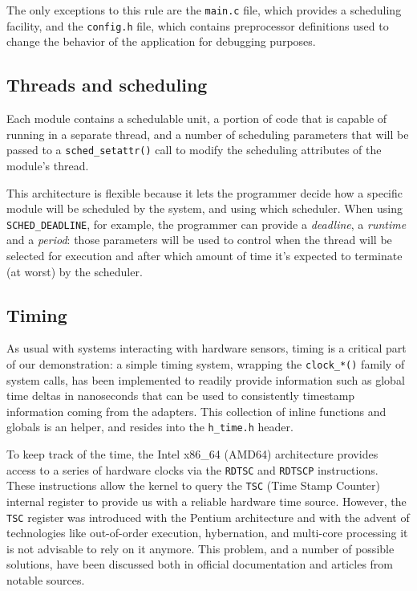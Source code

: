 \documentclass[a4paper,12pt]{report}
\begin{document}
The only exceptions to this rule are the \texttt{main.c} file, which provides a scheduling facility, and the \texttt{config.h} file, which contains preprocessor definitions used to change the behavior of the application for debugging purposes.

\subsection{Threads and scheduling}

Each module contains a schedulable unit, a portion of code that is capable of running in a separate thread, and a number of scheduling parameters that will be passed to a \texttt{sched\_setattr()} call to modify the scheduling attributes of the module's thread.

This architecture is flexible because it lets the programmer decide how a specific module will be scheduled by the system, and using which scheduler. When using \texttt{SCHED\_DEADLINE}, for example, the programmer can provide a \textit{deadline}, a \textit{runtime} and a \textit{period}: those parameters will be used to control when the thread will be selected for execution and after which amount of time it's expected to terminate (at worst) by the scheduler.

\subsection{Timing}

As usual with systems interacting with hardware sensors, timing is a critical part of our demonstration: a simple timing system, wrapping the \texttt{clock\_*()} family of system calls, has been implemented to readily provide information such as global time deltas in nanoseconds that can be used to consistently timestamp information coming from the adapters. This collection of inline functions and globals is an helper, and resides into the \texttt{h\_time.h} header. 

To keep track of the time, the Intel x86\_64 (AMD64) architecture provides access to a series of hardware clocks via the \texttt{RDTSC} and \texttt{RDTSCP} instructions. These instructions allow the kernel to query the \texttt{TSC} (Time Stamp Counter) internal register to provide us with a reliable hardware time source. However, the \texttt{TSC} register was introduced with the Pentium architecture and with the advent of technologies like out-of-order execution, hybernation, and multi-core processing it is not advisable to rely on it anymore. This problem, and a number of possible solutions, have been discussed both in official documentation\cite{intel-rdtsc-bench} and articles from notable sources\cite{ms-rdtsc-issues}.
\end{document}
